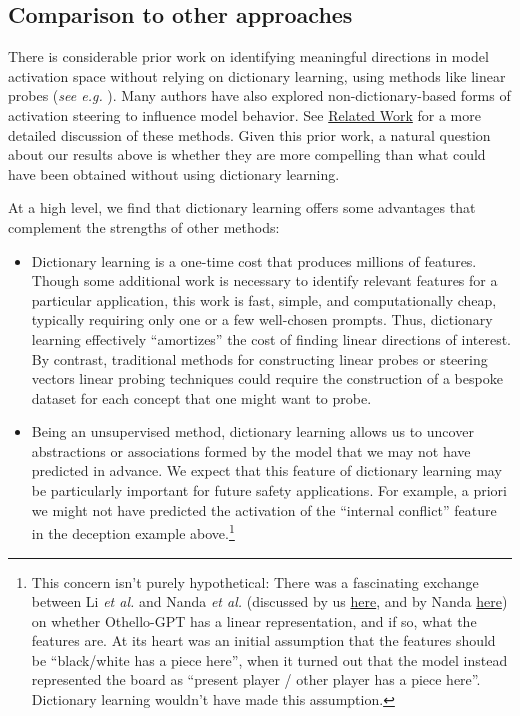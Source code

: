 \documentclass{article}
\let\oldsubsection\subsection
\renewcommand{\subsection}{\FloatBarrier\oldsubsection}
\begin{document}
\subsection{Comparison to other approaches}\label{sec:safety-relevant-comparison}

There is considerable prior work on identifying meaningful directions in model activation space without relying on dictionary learning, using methods like linear probes (\textit{see e.g.} \cite{burns2022discovering,kadavath2022language,marks2023geometry,bolukbasi2016man,dev2020measuring}). Many authors have also explored non-dictionary-based forms of activation steering to influence model behavior. See \hyperref[sec:related-work]{Related Work} for a more detailed discussion of these methods. Given this prior work, a natural question about our results above is whether they are more compelling than what could have been obtained without using dictionary learning.

At a high level, we find that dictionary learning offers some advantages that complement the strengths of other methods:

\begin{itemize}
    \item Dictionary learning is a one-time cost that produces millions of features. Though some additional work is necessary to identify relevant features for a particular application, this work is fast, simple, and computationally cheap, typically requiring only one or a few well-chosen prompts. Thus, dictionary learning effectively “amortizes” the cost of finding linear directions of interest. By contrast, traditional methods for constructing linear probes or steering vectors linear probing techniques could require the construction of a bespoke dataset for each concept that one might want to probe.
    \item Being an unsupervised method, dictionary learning allows us to uncover abstractions or associations formed by the model that we may not have predicted in advance. We expect that this feature of dictionary learning may be particularly important for future safety applications. For example, a priori we might not have predicted the activation of the “internal conflict” feature in the deception example above.\footnote{This concern isn't purely hypothetical: There was a fascinating exchange between Li \textit{et al.} \cite{li2022emergent} and Nanda \textit{et al.} \cite{nanda2023actually} (discussed by us \href{https://transformer-circuits.pub/2023/may-update/index.html\#external-representations}{here}, and by Nanda \href{https://transformer-circuits.pub/2022/toy_model/index.html\#comment-nanda}{here}) on whether Othello-GPT has a linear representation, and if so, what the features are. At its heart was an initial assumption that the features should be “black/white has a piece here”, when it turned out that the model instead represented the board as “present player / other player has a piece here”. Dictionary learning wouldn't have made this assumption.}
\end{itemize}
\end{document}
